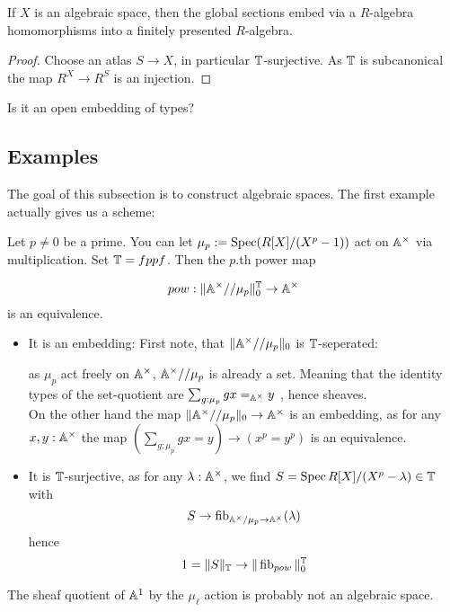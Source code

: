 \begin{lemma}
	If $X$ is an algebraic space, then the global sections embed via a $R$-algebra homomorphisms into a finitely presented $R$-algebra.
\end{lemma}
\begin{proof}
	Choose an atlas $S \to X$, in particular $\mathbb{T}$-surjective. As $\mathbb{T}$ is subcanonical the map $R^X \to R^S$ is an injection.
\end{proof}
\begin{question}
	Is it an open embedding of types?
\end{question}
\subsection{Examples}
The goal of this subsection is to construct algebraic spaces. The first example actually gives us a scheme:
\begin{example}
	Let $p \neq 0$ be a prime. You can let $\mu_p := \operatorname{Spec}(R[X] / (X^p - 1))$ act on $\mathbb{A}^\times$ via multiplication. Set $\mathbb{T}= fppf$. Then the $p$.th power map
	
	\[
	pow : \| \mathbb{A}^\times // \mu_p \|_0^{\mathbb{T}} \to \mathbb{A}^\times
	\]
	is an equivalence.
	\begin{itemize}
		\item 	 It is an embedding: 
		First note, that $\|\mathbb{A}^\times // \mu_p \|_0$ is $\mathbb{T}$-seperated:
		
		as $\mu_p$ act freely on $\mathbb{A}^\times$, $\mathbb{A}^\times // \mu_p$ is already a set. Meaning that the identity types of the set-quotient are $\sum_{g: \mu_p} g x =_{\mathbb{A}^\times} y$ , hence sheaves. \\
		On the other hand the map $\|\mathbb{A}^\times // \mu_p \|_0 \to \mathbb{A}^\times$ is an embedding, as for any $x , y : \mathbb{A}^\times$ the map $(\sum_{g : \mu_p} g x = y) \to (x^p = y^p)$ is an equivalence. 
		\item 	It is $\mathbb{T}$-surjective, as for any $\lambda : \mathbb{A}^\times$, we find $S = \operatorname{Spec} R [X] / (X^p - \lambda) \in \mathbb{T}$ with 
		\[
		S \to \operatorname{fib}_{\mathbb{A}^\times / \mu_p \to \mathbb{A}^\times}(\lambda)
		\]
		hence 
		\[
		1 = \|S\|_{\mathbb{T}} \to \|\operatorname{fib}_{pow}\|_0^{\mathbb{T}}
		\]
	\end{itemize}
	
	
\end{example}
\begin{example}[TODO]
	The sheaf quotient of $\mathbb{A}^1$ by the $\mu_\ell$ action is probably not an algebraic space.
\end{example}

